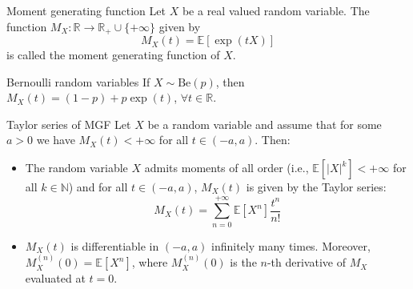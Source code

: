 \documentclass[11pt, a4paper]{article}
\begin{document}
\begin{definition}{Moment generating function}{}
Let $X$ be a real valued random variable. The function $M_X: \mathbb{R} \to \mathbb{R}_+ \cup \{+\infty\}$ given by
\[ M_X(t) = \mathbb{E}[\exp(tX)] \]
is called the moment generating function of $X$.
\end{definition}

\begin{example}{Bernoulli random variables}{}
If $X \sim \text{Be}(p)$, then $M_X(t) = (1 - p) + p \exp(t)$, $\forall t \in \mathbb{R}$.
\end{example}

\begin{theorem}{Taylor series of MGF}{}
Let $X$ be a random variable and assume that for some $a > 0$ we have $M_X(t) < +\infty$ for all $t \in (-a, a)$. Then:
\begin{itemize}
    \item The random variable $X$ admits moments of all order (i.e., $\mathbb{E}[|X|^k] < +\infty$ for all $k \in \mathbb{N}$) and for all $t \in (-a, a)$, $M_X(t)$ is given by the Taylor series:
    \[ M_X(t) = \sum_{n=0}^{+\infty} \mathbb{E}[X^n]\frac{t^n}{n!} \]
    \item $M_X(t)$ is differentiable in $(-a, a)$ infinitely many times. Moreover, $M_X^{(n)}(0) = \mathbb{E}[X^n]$, where $M_X^{(n)}(0)$ is the $n$-th derivative of $M_X$ evaluated at $t=0$.
\end{itemize}
\end{theorem}
\end{document}

